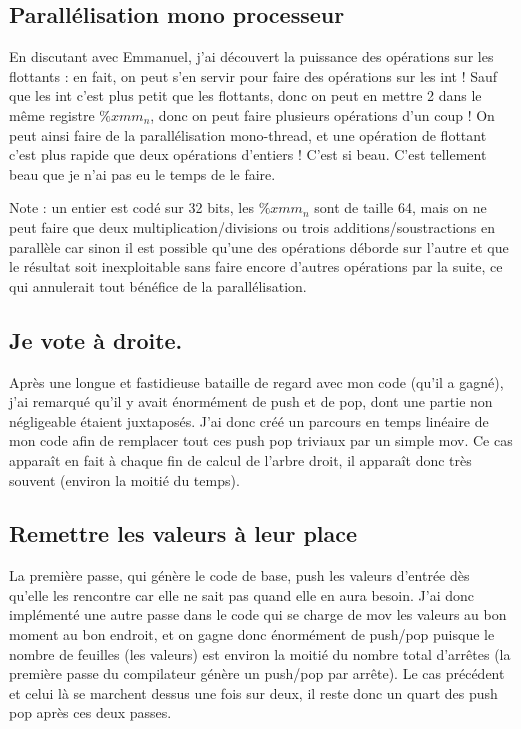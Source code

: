 \documentclass{article}
\begin{document}
\subsection{Parallélisation mono processeur}
En discutant avec Emmanuel, j'ai découvert la puissance des opérations sur les flottants : en fait, on peut s'en servir pour faire des opérations sur les int ! Sauf que les int c'est plus petit que les flottants, donc on peut en mettre 2 dans le même registre $\%xmm_n$, donc on peut faire plusieurs opérations d'un coup ! On peut ainsi faire de la parallélisation mono-thread, et une opération de flottant c'est plus rapide que deux opérations d'entiers ! C'est si beau. C'est tellement beau que je n'ai pas eu le temps de le faire.

Note : un entier est codé sur 32 bits, les $\%xmm_n$ sont de taille 64, mais on ne peut faire que deux multiplication/divisions ou trois additions/soustractions en parallèle car sinon il est possible qu'une des opérations déborde sur l'autre et que le résultat soit inexploitable sans faire encore d'autres opérations par la suite, ce qui annulerait tout bénéfice de la parallélisation.

\subsection{Je vote à droite.}
Après une longue et fastidieuse bataille de regard avec mon code (qu'il a gagné), j'ai remarqué qu'il y avait énormément de push et de pop, dont une partie non négligeable étaient juxtaposés. J'ai donc créé un parcours en temps linéaire de mon code afin de remplacer tout ces push pop triviaux par un simple mov.\newline
Ce cas apparaît en fait à chaque fin de calcul de l'arbre droit, il apparaît donc très souvent (environ la moitié du temps).

\subsection{Remettre les valeurs à leur place}
La première passe, qui génère le code de base, push les valeurs d'entrée dès qu'elle les rencontre car elle ne sait pas quand elle en aura besoin. J'ai donc implémenté une autre passe dans le code qui se charge de mov les valeurs au bon moment au bon endroit, et on gagne donc énormément de push/pop puisque le nombre de feuilles (les valeurs) est environ la moitié du nombre total d'arrêtes (la première passe du compilateur génère un push/pop par arrête). Le cas précédent et celui là se marchent dessus une fois sur deux, il reste donc un quart des push pop après ces deux passes.
\end{document}
